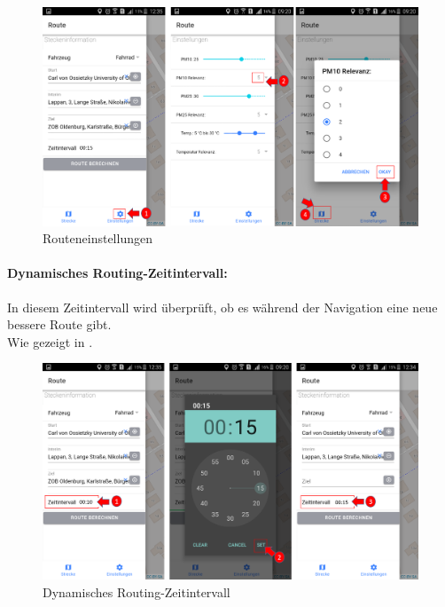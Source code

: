 \begin{figure}[h!]
\centerline{\includegraphics[height=8 cm]{./ressourcen/nutzerhandbuch/einstellungen.png}}
\caption{Routeneinstellungen}
\label{fig:app:Routeneinstellungen}
\end{figure} 

\newpage
\paragraph{Dynamisches Routing-Zeitintervall:}
In diesem Zeitintervall wird überprüft, ob es während der Navigation eine neue bessere Route gibt.\\
Wie gezeigt in .
\begin{figure}[h!]
\centerline{\includegraphics[height=6 cm]{./ressourcen/nutzerhandbuch/zeitintervall.png}}
\caption{Dynamisches Routing-Zeitintervall}
\label{fig:app:Dynamisches_Routing_Zeitintervall}
\end{figure} 


